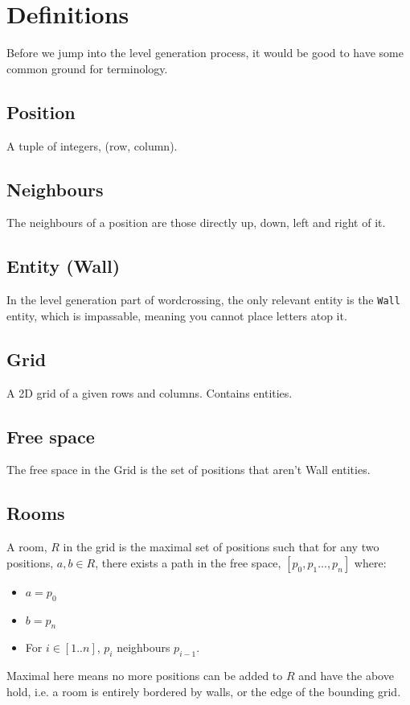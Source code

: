 \documentclass{article}
\begin{document}
\newpage

\section{Definitions}
Before we jump into the level generation process, it would be good to have
some common ground for terminology.

\subsection*{Position}
A tuple of integers, (row, column).

\subsection*{Neighbours}
The neighbours of a position are those directly up, down, left and right of it.

\subsection*{Entity (Wall)}
In the level generation part of wordcrossing, the only relevant 
entity is the \texttt{Wall} entity, which is impassable, meaning you 
cannot place letters atop it.

\subsection*{Grid}
A 2D grid of a given rows and columns. Contains entities.

\subsection*{Free space}
The free space in the Grid is the set of positions that aren't Wall entities.

\subsection*{Rooms}
A room, $R$ in the grid is the maximal set of positions such that for any two 
positions, $a, b \in R$, there exists a path in the free space, $[p_0, p_1 ... , p_{n}]$ where:
\begin{itemize}
  \item $a=p_0$
  \item $b=p_n$
  \item For $i \in [1..n]$, $p_i$ neighbours $p_{i-1}$.
\end{itemize}
Maximal here means no more positions can be added to $R$ and have the above hold, i.e. a room is
entirely bordered by walls, or the edge of the bounding grid.
\end{document}
